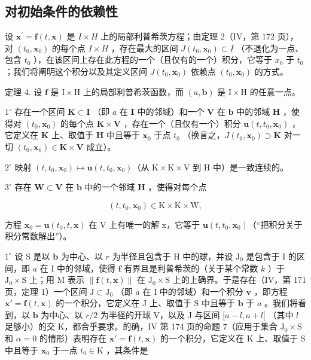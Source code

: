 \subsection{对初始条件的依赖性}

设 \(\mathbf{x}^{\prime}=\mathbf{f}(t,\mathbf{x})\) 是 \(I\times H\) 上的局部利普希茨方程；由定理 2（IV，第 172 页），对 \((t_{0},\mathbf{x}_{0})\) 的每个点 \(I\times H\) ，存在最大的区间 \(J(t_{0},\mathbf{x}_{0})\subset I\) （不退化为一点、包含 \(t_{0}\) ），在该区间上存在此方程的一个（且仅有的一个）积分，它等于 \(x_{0}\) 于 \(t_{0}\) ；我们将阐明这个积分以及其定义区间 \(J(t_{0},\mathbf{x}_{0})\) 依赖点 \((t_{0},\mathbf{x}_{0})\) 的方式。

定理 4. 设 \(\mathbf{f}\) 是 \(\mathrm{I} \times \mathrm{H}\) 上的局部利普希茨函数，而 \((a, \mathbf{b})\) 是 \(\mathrm{I} \times \mathrm{H}\) 的任意一点。

\(1^{\circ}\) 存在一个区间 \(\mathbf{K} \subset \mathbf{I}\) （即 \(a\) 在 \(\mathbf{I}\) 中的邻域）和一个 \(\mathbf{V}\) 在 \(\mathbf{b}\) 中的邻域 \(\mathbf{H}\) ，使得对 \((t_0, \mathbf{x}_0)\) 的每个点 \(\mathbf{K} \times \mathbf{V}\) ，存在一个（且仅有一个）积分 \(\mathbf{u}(t, t_0, \mathbf{x}_0)\) ，它定义在 \(\mathbf{K}\) 上、取值于 \(\mathbf{H}\) 中且等于 \(\mathbf{x}_0\) 于点 \(t_0\) （换言之，\(J(t_0, \mathbf{x}_0) \supset \mathbf{K}\) 对一切 \((t_0, \mathbf{x}_0) \in \mathbf{K} \times \mathbf{V}\) 成立）。

\(2^{\circ}\) 映射 \((t,t_0,\mathbf{x}_0)\mapsto \mathbf{u}(t,t_0,\mathbf{x}_0)\)（从 \(\mathrm{K}\times \mathrm{K}\times \mathrm{V}\) 到 H 中）是一致连续的。

\(3^{\circ}\) 存在 \(\mathbf{W} \subset \mathbf{V}\) 在 \(\mathbf{b}\) 中的一个邻域 \(\mathbf{H}\) ，使得对每个点

\[
(t, t _ {0}, \mathbf {x} _ {0}) \in \mathrm{K} \times \mathrm{K} \times \mathrm{W},
\]

方程 \(\mathbf{x}_{0} = \mathbf{u}(t_{0}, t, \mathbf{x})\) 在 V 上有唯一的解 x，它等于 \(\mathbf{u}(t, t_{0}, \mathbf{x}_{0})\)（“把积分关于积分常数解出”）。

\(1^{\circ}\) 设 S 是以 \(\mathbf{b}\) 为中心、以 \(r\) 为半径且包含于 H 中的球，并设 \(\mathrm{J}_0\) 是包含于 I 的区间，即 \(a\) 在 I 中的邻域，使得 \(\mathbf{f}\) 有界且是利普希茨的（关于某个常数 \(k\) ）于 \(\mathrm{J}_0 \times \mathrm{S}\) 上；用 M 表示 \(\| \mathbf{f}(t, \mathbf{x})\|\) 在 \(\mathrm{J}_0 \times \mathrm{S}\) 上的上确界。于是存在（IV，第 171 页，定理 1）一个区间 \(\mathrm{J} \subset \mathrm{J}_0\) （即 \(a\) 在 I 中的邻域）和一个积分 \(\mathbf{v}\) ，即方程 \(\mathbf{x}' = \mathbf{f}(t, \mathbf{x})\) 的一个积分，它定义在 J 上、取值于 S 中且等于 \(\mathbf{b}\) 于 \(a\) 。我们将看到，以 \(\mathbf{b}\) 为中心、以 \(r/2\) 为半径的开球 V，以及 J 与区间 \([a - l, a + l[\) （其中 \(l\) 足够小）的交 K，都合乎要求。的确，IV 第 174 页的命题 7（应用于集合 \(\mathrm{J}_0 \times \mathrm{S}\) 和 \(\alpha = 0\) 的情形）表明存在 \(\mathbf{x}' = \mathbf{f}(t, \mathbf{x})\) 的一个积分，它定义在 K 上、取值于 S 中且等于 \(\mathbf{x}_0\) 于一点 \(t_0 \in \mathrm{K}\) ，其条件是

